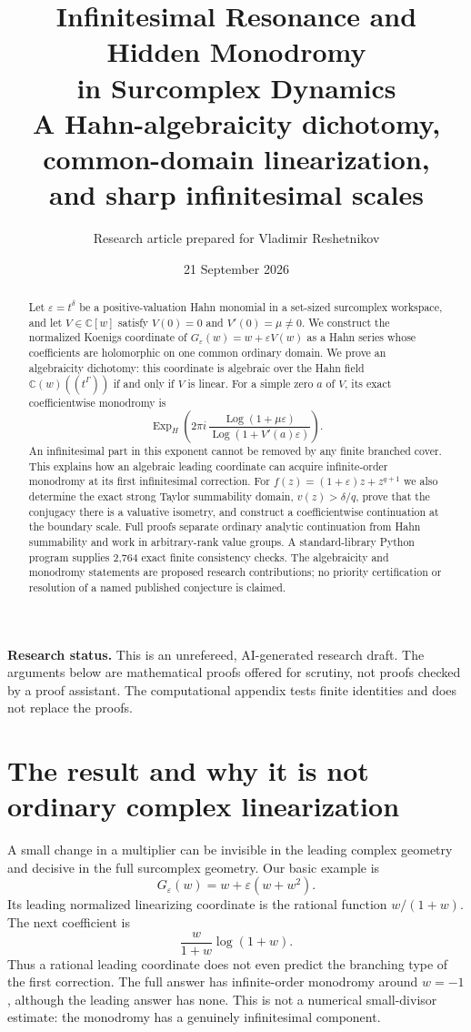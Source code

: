 \documentclass[11pt,a4paper]{article}
\title{\textbf{Infinitesimal Resonance and Hidden Monodromy\\
in Surcomplex Dynamics}\\[7pt]
\large A Hahn-algebraicity dichotomy, common-domain linearization,\\
and sharp infinitesimal scales}
\author{Research article prepared for Vladimir Reshetnikov}
\date{21 September 2026}
\numberwithin{equation}{section}
\theoremstyle{definition}
\theoremstyle{remark}
\newcommand{\C}{\mathbb C}
\newcommand{\eps}{\varepsilon}
\newcommand{\Log}{\operatorname{Log}}
\newcommand{\ExpH}{\operatorname{Exp}_{\!H}}
\begin{document}
\maketitle
\begin{abstract}
Let $\eps=t^\delta$ be a positive-valuation Hahn monomial in a set-sized
surcomplex workspace, and let $V\in\C[w]$ satisfy $V(0)=0$ and
$V'(0)=\mu\ne0$.  We construct the normalized Koenigs coordinate of
$G_\eps(w)=w+\eps V(w)$ as a Hahn series whose coefficients are holomorphic
on one common ordinary domain.  We prove an algebraicity dichotomy:
this coordinate is algebraic over the Hahn field
$\C(w)((t^\Gamma))$ if and only if $V$ is linear.  For a simple zero $a$ of
$V$, its exact coefficientwise monodromy is
\[
 \ExpH\!\left(2\pi i\,
 \frac{\Log(1+\mu\eps)}{\Log(1+V'(a)\eps)}\right).
\]
An infinitesimal part in this exponent cannot be removed by any finite
branched cover.  This explains how an algebraic leading coordinate can
acquire infinite-order monodromy at its first infinitesimal correction.
For $f(z)=(1+\eps)z+z^{q+1}$ we also determine the exact strong Taylor
summability domain, $v(z)>\delta/q$, prove that the conjugacy there is a
valuative isometry, and construct a coefficientwise continuation at the
boundary scale.  Full proofs separate ordinary analytic continuation from
Hahn summability and work in arbitrary-rank value groups.  A standard-library
Python program supplies 2,764 exact finite consistency checks.  The
algebraicity and monodromy statements are proposed research contributions;
no priority certification or resolution of a named published conjecture is
claimed.
\end{abstract}

\medskip
\noindent\textbf{Research status.}
This is an unrefereed, AI-generated research draft.  The arguments below are
mathematical proofs offered for scrutiny, not proofs checked by a proof
assistant.  The computational appendix tests finite identities and does not
replace the proofs.

\clearpage
\setcounter{tocdepth}{2}
{\small\tableofcontents}
\clearpage

\section{The result and why it is not ordinary complex linearization}
\label{sec:intro}

A small change in a multiplier can be invisible in the leading complex
geometry and decisive in the full surcomplex geometry.  Our basic example is
\begin{equation}\label{eq:basicexample}
 G_\eps(w)=w+\eps(w+w^2).
\end{equation}
Its leading normalized linearizing coordinate is the rational function
$w/(1+w)$.  The next coefficient is
\[
 \frac{w}{1+w}\log(1+w).
\]
Thus a rational leading coordinate does not even predict the branching type
of the first correction.  The full answer has infinite-order monodromy
around $w=-1$, although the leading answer has none.  This is not a numerical
small-divisor estimate: the monodromy has a genuinely infinitesimal component.
\end{document}
